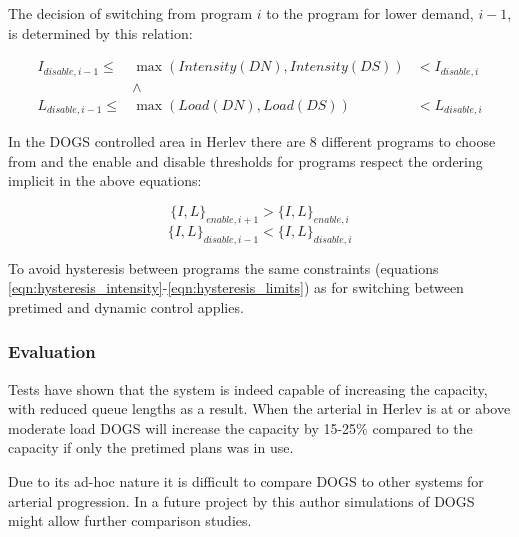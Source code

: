 The decision of switching from program $i$ to the program for lower demand, $i-1$, is determined by this relation:

\begin{eqnarray*}
I_{disable,i-1} \leq & \max(Intensity(DN),Intensity(DS)) & < I_{disable,i} \\
& \wedge & \\
L_{disable,i-1} \leq & \max(Load(DN),Load(DS))  & < L_{disable,i}
\end{eqnarray*}

In the DOGS controlled area in Herlev there are 8 different programs to choose from and the enable and disable thresholds for programs respect the ordering implicit in the above equations:

$$\lbrace I,L \rbrace_{enable,i+1} > \lbrace I,L \rbrace_{enable,i}$$
$$\lbrace I,L \rbrace_{disable,i-1} < \lbrace I,L \rbrace_{disable,i}$$

To avoid hysteresis between programs the same constraints (equations \ref{eqn:hysteresis_intensity}-\ref{eqn:hysteresis_limits}) as for switching between pretimed and dynamic control applies.

\subsubsection*{Evaluation}
Tests have shown that the system is indeed capable of increasing the capacity, with reduced queue lengths as a result. When the arterial in Herlev is at or above moderate load DOGS will increase the capacity by 15-25\% compared to the capacity if only the pretimed plans was in use.

Due to its ad-hoc nature it is difficult to compare DOGS to other systems for arterial progression. In a future project by this author simulations of DOGS might allow further comparison studies.